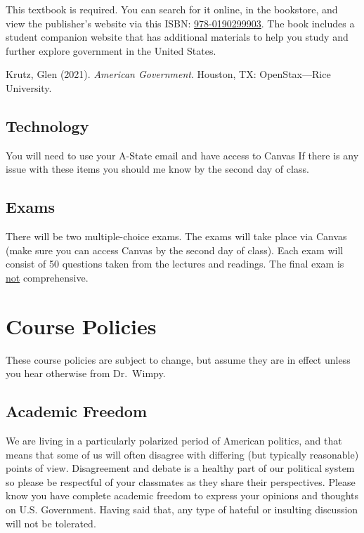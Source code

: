 \documentclass[11pt,]{article}
\begin{document}
This textbook is required. You can search for it online, in the
bookstore, and view the publisher's website via this ISBN:
\href{http://global.oup.com/ushe/product/american-government-9780190299903}{978-0190299903}.
The book includes a student companion website that has additional
materials to help you study and further explore government in the United
States.

\hangindent=0.7cm

Krutz, Glen (2021). \emph{American Government}. Houston, TX:
OpenStax---Rice University.

\hypertarget{technology}{%
\subsection{Technology}\label{technology}}

You will need to use your A-State email and have access to Canvas If
there is any issue with these items you should me know by the second day
of class.

\hypertarget{exams}{%
\subsection{Exams}\label{exams}}

There will be two multiple-choice exams. The exams will take place via
Canvas (make sure you can access Canvas by the second day of class).
Each exam will consist of 50 questions taken from the lectures and
readings. The final exam is \underline{not} comprehensive.

\hypertarget{course-policies}{%
\section{Course Policies}\label{course-policies}}

These course policies are subject to change, but assume they are in
effect unless you hear otherwise from Dr.~Wimpy.

\hypertarget{academic-freedom}{%
\subsection{Academic Freedom}\label{academic-freedom}}

We are living in a particularly polarized period of American politics,
and that means that some of us will often disagree with differing (but
typically reasonable) points of view. Disagreement and debate is a
healthy part of our political system so please be respectful of your
classmates as they share their perspectives. Please know you have
complete academic freedom to express your opinions and thoughts on U.S.
Government. Having said that, any type of hateful or insulting
discussion will not be tolerated.
\end{document}

